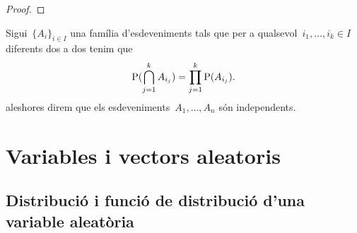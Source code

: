 \documentclass[../../main.tex]{subfiles}
\begin{document}
    \begin{proof}
    \end{proof}
    \begin{definition}
        \label{def:esdeveniments independents cas general}
        Sigui~\(\{A_{i}\}_{i\in I}\) una família d'esdeveniments tals que per a qualsevol~\(i_{1},\dots,i_{k}\in I\) diferents dos a dos tenim que
        \[
            \mathrm{P}(\bigcap_{j=1}^{k}A_{i_{j}})=\prod_{j=1}^{k}\mathrm{P}(A_{i_{j}}).
        \]
        aleshores direm que els esdeveniments~\(A_{1},\dots,A_{n}\) són independents.
    \end{definition}
\chapter{Variables i vectors aleatoris}
\section{Distribució i funció de distribució d'una variable aleatòria}
\end{document}
